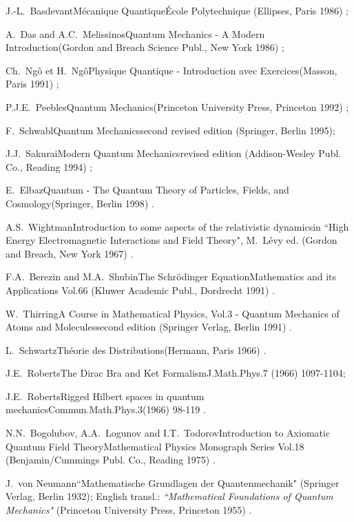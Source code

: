 \documentclass[a4wide,12pt]{report}
\begin{document}
\begin{thebibliography}{22}
\bookref
{J.-L.~Basdevant}{M\'ecanique Quantique}{\'Ecole Polytechnique
(Ellipses, Paris 1986) ;}
 
\bookref
{A.~Das and A.C.~Melissinos}{Quantum Mechanics - A Modern
Introduction}{(Gordon and Breach Science Publ., New York 1986) ;}
 
\bookref
{Ch.~Ng\^o et H.~Ng\^o}{Physique Quantique - Introduction avec
Exercices}{(Masson, Paris 1991) ;}
 
\bookref
{P.J.E.~Peebles}{Quantum Mechanics}{(Princeton University Press,
Princeton 1992) ;}

\bookref
{F.~Schwabl}{Quantum Mechanics}{second revised edition (Springer, Berlin 
1995);}

\bookref
{J.J.~Sakurai}{Modern Quantum Mechanics}{revised edition
(Addison-Wesley Publ. Co., Reading 1994) ;}
 
\bookref
{E.~Elbaz}{Quantum - The Quantum Theory of Particles, 
Fields, and Cosmology}{(Springer, Berlin 
1998) .}


\prepref
{A.S.~Wightman}{Introduction to some aspects of the relativistic
dynamics}{in ``High Energy Electromagnetic Interactions and
Field Theory", M.~L\'evy ed. (Gordon and Breach, New York 1967) .}

 
\bookref
{F.A.~Berezin and M.A.~Shubin}{The Schr\"odinger Equation}{Mathematics
and its Applications Vol.66 (Kluwer Academic Publ., Dordrecht 1991) .}
 
\bookref
{W.~Thirring}{A
Course in Mathematical Physics, Vol.3 -
Quantum Mechanics of Atoms and Molecules}{second edition
(Springer Verlag, Berlin 1991) .}
  

\bookref
{L.~Schwartz}{Th\'eorie des Distributions}{(Hermann, Paris 1966) .}

 
\artref
{J.E.~Roberts}{The Dirac Bra and Ket Formalism}{J.Math.Phys.}{7}{
(1966) 1097-1104;}
 
\artref
{J.E.~Roberts}{Rigged Hilbert spaces in quantum
mechanics}{Commun.Math.Phys.}{3}{(1966) 98-119 .}

 
\bookref
{N.N.~Bogolubov, A.A.~Logunov and I.T.~Todorov}{Introduction to
Axiomatic Quantum Field Theory}{Mathematical Physics Monograph
Series Vol.18 (Benjamin/Cummings Publ. Co., Reading 1975) .}

 
\prepref
{J.~von Neumann}{``Mathematische Grundlagen der Quantenmechanik"}{
(Springer Verlag, Berlin 1932); English transl.: {\it
``Mathematical Foundations of Quantum Mechanics"}
(Princeton University Press, Princeton 1955) .}
 

\end{thebibliography}
\end{document}
